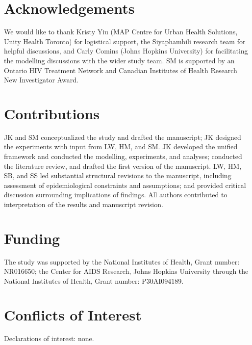 \section*{Acknowledgements}
We would like to thank
Kristy Yiu (MAP Centre for Urban Health Solutions, Unity Health Toronto) for logistical support,
the Siyaphambili research team for helpful discussions,		%
and Carly Comins (Johns Hopkins University)
for facilitating the modelling discussions with the wider study team.
SM is supported by an Ontario HIV Treatment Network and
Canadian Institutes of Health Research New Investigator Award.
\section*{Contributions}
JK and SM conceptualized the study and drafted the manuscript;
JK designed the experiments with input from LW, HM, and SM.
JK developed the unified framework and conducted the modelling, experiments,
and analyses; conducted the literature review, and drafted the first version of the manuscript. 
LW, HM, SB, and SS led substantial structural
revisions to the manuscript, including assessment of epidemiological constraints and assumptions; and provided
critical discussion surrounding implications of findings.
All authors contributed to interpretation of the results and manuscript revision.
\section*{Funding}
The study was supported by
the National Institutes of Health, Grant number: NR016650;
the Center for AIDS Research, Johns Hopkins University
  through the National Institutes of Health, Grant number: P30AI094189.
\section*{Conflicts of Interest}
Declarations of interest: none.
